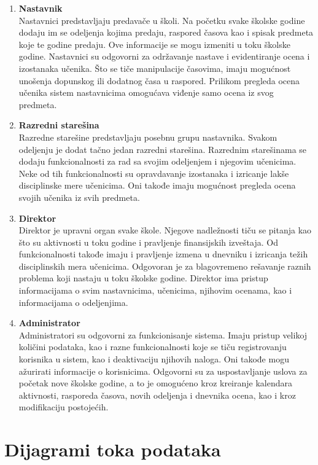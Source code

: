 \documentclass{article}
\begin{document}
\begin{enumerate}
	\item \textbf{Nastavnik} \\
	Nastavnici predstavljaju predavače u školi. Na početku svake školske godine dodaju im se odeljenja kojima predaju, raspored časova kao i spisak predmeta koje te godine predaju. Ove informacije se mogu izmeniti u toku školske godine. Nastavnici su odgovorni za održavanje nastave i evidentiranje ocena i izostanaka učenika. Što se tiče manipulacije časovima, imaju mogućnost unošenja dopunskog ili dodatnog časa u raspored. Prilikom pregleda ocena učenika sistem nastavnicima omogućava viđenje samo ocena iz svog predmeta.
	\item \textbf{Razredni starešina} \\
	Razredne starešine predstavljaju posebnu grupu nastavnika. Svakom odeljenju je dodat tačno jedan razredni starešina. Razrednim starešinama se dodaju funkcionalnosti za rad sa svojim odeljenjem i njegovim učenicima. Neke od tih funkcionalnosti su opravdavanje izostanaka i izricanje lakše disciplinske mere učenicima. Oni takođe imaju mogućnost pregleda ocena svojih učenika iz svih predmeta.
	\item \textbf{Direktor} \\
	 Direktor je upravni organ svake škole. Njegove nadležnosti tiču se pitanja kao što su aktivnosti u toku godine i pravljenje finansijskih izveštaja. Od funkcionalnosti takođe imaju i pravljenje izmena u dnevniku i izricanja težih disciplinskih mera učenicima. Odgovoran je za blagovremeno rešavanje raznih problema koji nastaju u toku školske godine. Direktor ima pristup informacijama o svim nastavnicima, učenicima, njihovim ocenama, kao i informacijama o odeljenjima.
	\item \textbf{Administrator} \\ 
	Administratori su odgovorni za funkcionisanje sistema. Imaju pristup velikoj količini podataka, kao i razne funkcionalnosti koje se tiču registrovanju korisnika u sistem, kao i deaktivaciju njihovih naloga. Oni takođe mogu ažurirati informacije o korisnicima. Odgovorni su za uspostavljanje uslova za početak nove školske godine, a to je omogućeno kroz kreiranje kalendara aktivnosti, rasporeda časova, novih odeljenja i dnevnika ocena, kao i kroz modifikaciju postojećih.
\end{enumerate}

\newpage
\section{Dijagrami toka podataka}
\end{document}
